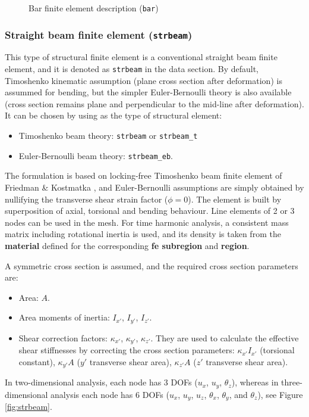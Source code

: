\documentclass[a4paper,fleqn]{book}
\begin{document}
\begin{figure}[h]

\caption{Bar finite element description (\texttt{bar})}
\label{fig:bar}
\end{figure}

\subsubsection{Straight beam finite element (\texttt{strbeam})}

This type of structural finite element is a conventional straight beam finite element, and it is denoted as \texttt{strbeam} in the data section. By default, Timoshenko kinematic assumption (plane cross section after deformation) is assummed for bending, but the simpler Euler-Bernoulli theory is also available (cross section remains plane and perpendicular to the mid-line after deformation). It can be chosen by using as the type of structural element:
\begin{itemize}
 \item Timoshenko beam theory: \texttt{strbeam} or \texttt{strbeam\_t}
 \item Euler-Bernoulli beam theory: \texttt{strbeam\_eb}.
\end{itemize}
The formulation is based on locking-free Timoshenko beam finite element of Friedman \& Kostmatka \cite{friedman1993}, and Euler-Bernoulli assumptions are simply obtained by nullifying the transverse shear strain factor ($\phi=0$). The element is built by superposition of axial, torsional and bending behaviour. Line elements of 2 or 3 nodes can be used in the mesh. For time harmonic analysis, a consistent mass matrix including rotational inertia is used, and its density is taken from the \textbf{material} defined for the corresponding \textbf{fe subregion} and \textbf{region}.

A symmetric cross section is assumed, and the required cross section parameters are:
\begin{itemize}
  \item Area: $A$.
  \item Area moments of inertia: $I_{x'}$, $I_{y'}$, $I_{z'}$.
  \item Shear correction factors: $\kappa_{x'}$, $\kappa_{y'}$, $\kappa_{z'}$. They are used to calculate the effective shear stiffnesses by correcting the cross section parameters: $\kappa_{x'}I_{x'}$ (torsional constant), $\kappa_{y'}A$ ($y'$ transverse shear area), $\kappa_{z'}A$ ($z'$ transverse shear area).
\end{itemize}
In two-dimensional analysis, each node has 3 DOFs ($u_x$, $u_y$, $\theta_z$), whereas in three-dimensional analysis each node has 6 DOFs ($u_x$, $u_y$, $u_z$, $\theta_x$, $\theta_y$, and $\theta_z$), see Figure \ref{fig:strbeam}.
\end{document}
